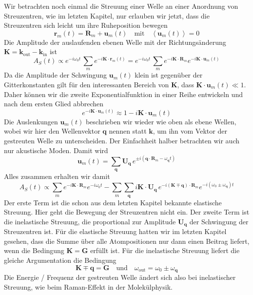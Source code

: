 Wir betrachten noch einmal die Streuung einer Welle an einer Anordnung von Streuzentren, wie im letzten Kapitel, nur erlauben wir jetzt, dass die Streuzentren sich leicht um ihre Ruheposition bewegen
\begin{equation}
\mathbf{r}_m(t) = \mathbf{R}_m + \mathbf{u}_m(t) \quad \text{mit} \quad \left<\mathbf{u}_m(t)\right> = 0
\end{equation}
Die Amplitude der auslaufenden ebenen Welle mit der Richtungsänderung $\mathbf{K} = \mathbf{k}_\text{out} - \mathbf{k}_\text{in}$ ist
\begin{equation}
A_S(t) \propto e^{-i \omega_0 t} \, \sum_m e^{-i \mathbf{K} \cdot \mathbf{r}_m(t)} =
e^{-i \omega_0 t} \, \sum_m e^{-i \mathbf{K} \cdot \mathbf{R}_m}  e^{-i \mathbf{K} \cdot \mathbf{u}_m(t)}
\end{equation}
Da die Amplitude der Schwingung $\mathbf{u}_m(t)$ klein ist gegenüber der Gitterkonstanten  gilt für den interessanten Bereich von $\mathbf{K}$, dass  $\mathbf{K} \cdot\mathbf{u}_m(t) \ll 1 $. Daher können wir die zweite Exponentialfunktion in einer Reihe entwickeln und nach dem ersten Glied abbrechen
\begin{equation}
 e^{-i \mathbf{K} \cdot \mathbf{u}_m(t)} \approx 1 - i \mathbf{K} \cdot \mathbf{u}_m(t)
\end{equation}
Die Auslenkungen $\mathbf{u}_m(t)$ beschrieben wir wieder wie oben als ebene Wellen, wobei wir hier den Wellenvektor $\mathbf{q}$ nennen statt $\mathbf{k}$, um ihn vom Vektor der gestreuten Welle zu unterscheiden. Der Einfachheit halber betrachten wir auch nur akustische Moden. Damit wird
\begin{equation}
\mathbf{u}_m(t) = \sum_\mathbf{q} \mathbf{U}_\mathbf{q} \, 
e^{ \pm i ( \mathbf{q} \cdot \mathbf{R}_m - \omega_\mathbf{q} t ) }
\end{equation}
Alles zusammen erhalten wir damit
\begin{equation}
A_S(t) \propto 
\sum_m e^{-i \mathbf{K} \cdot \mathbf{R}_m}  
e^{-i \omega_0 t} 
-
\sum_m \sum_\mathbf{q}  i \mathbf{K} \cdot \mathbf{U}_\mathbf{q} \,
 e^{-i (\mathbf{K} \mp \mathbf{q} ) \cdot \mathbf{R}_m}  
e^{-i (\omega_0 \pm \omega_\mathbf{q})  t} 
\end{equation}
Der erste Term ist die schon aus dem letzten Kapitel bekannte elastische Streuung. Hier geht die Bewegung der Streuzentren nicht ein. Der zweite Term ist die inelastische Streuung, die proportional zur Amplitude $\mathbf{U}_\mathbf{q}$ der Schwingung der Streuzentren ist. Für die elastische Streuung hatten wir im letzten Kapitel gesehen, dass die Summe über alle Atompositionen nur dann einen Beitrag liefert, wenn die Bedingung $\mathbf{K} = \mathbf{G}$ erfüllt ist. Für die inelastische Streuung liefert die gleiche Argumentation die Bedingung
\begin{equation}
 \mathbf{K} \mp \mathbf{q} = \mathbf{G} \quad \text{und} \quad \omega_\text{out} = \omega_0 \pm \omega_\mathbf{q}
\end{equation}
Die Energie / Frequenz der gestreuten Welle ändert sich also bei inelastischer Streuung, wie beim Raman-Effekt in der Molekülphysik.




